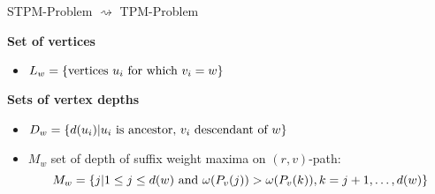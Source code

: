 \documentclass[18pt]{beamer}
\begin{document}
\begin{frame}{STPM-Problem $	\rightsquigarrow$ TPM-Problem}
	
\end{frame}
\begin{frame}
	\textbf{Set of vertices}
		\begin{itemize}
			\item $L_w = \{\textup{vertices }u_i \textup{ for which } v_i = w\}$ 
		\end{itemize}
	\textbf{Sets of vertex depths}
	\begin{itemize}
		\item $D_w = \{d(u_i) | u_i \textup{ is ancestor, } v_i \textup{ descendant of } w\}$
		\item $M_w$ set of depth of suffix weight maxima on $(r,v)$-path:
		\[
			M_w = \{j | 1 \le j \le d(w) \textup{ and } \omega(P_v(j)) > \omega(P_v(k)), k = j+1, \dots, d(w)\}
		\]
		
		
	\end{itemize}
	
\end{frame}
\end{document}
